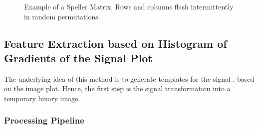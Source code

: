 \documentclass[entropy,article,submit,moreauthors,pdftex,10pt,a4paper]{mdpi}
\begin{document}
\begin{figure}[H]
\centering
{}
\caption{Example of a Speller Matrix.  Rows and columns flash intermittently in random permutations.}
\label{fig:p300matrix}
\end{figure}

\subsection{Feature Extraction based on Histogram of Gradients of the Signal Plot} \label{Feature}

The underlying idea of this method is to generate templates for the signal \citep{Ramele2016}, based on the image plot.  Hence, the first step is the signal transformation into a temporary binary image.

\subsubsection{Processing Pipeline} \label{Pipeline}
\end{document}
